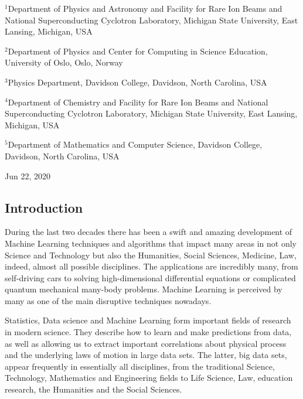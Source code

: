 \documentclass[%
oneside,                 %
final,                   %
10pt]{article}
\begin{document}
\begin{center}
\centerline{{\small ${}^1$Department of Physics and Astronomy and Facility for Rare Ion Beams and National Superconducting Cyclotron Laboratory, Michigan State University, East Lansing, Michigan, USA}}
\centerline{{\small ${}^2$Department of Physics and Center for Computing in Science Education, University of Oslo, Oslo, Norway}}
\centerline{{\small ${}^3$Physics Department, Davidson College, Davidson, North Carolina, USA}}
\centerline{{\small ${}^4$Department of Chemistry and Facility for Rare Ion Beams  and National Superconducting Cyclotron Laboratory, Michigan State University, East Lansing, Michigan, USA}}
\centerline{{\small ${}^5$Department of Mathematics and Computer Science, Davidson College, Davidson, North Carolina, USA}}
\end{center}
    

\begin{center}
Jun 22, 2020
\end{center}

\vspace{1cm}


\subsection{Introduction}

During the last two decades there has been a swift and amazing
development of Machine Learning techniques and algorithms that impact
many areas in not only Science and Technology but also the Humanities,
Social Sciences, Medicine, Law, indeed, almost all possible
disciplines. The applications are incredibly many, from self-driving
cars to solving high-dimensional differential equations or complicated
quantum mechanical many-body problems. Machine Learning is perceived
by many as one of the main disruptive techniques nowadays. 

Statistics, Data science and Machine Learning form important
fields of research in modern science.  They describe how to learn and
make predictions from data, as well as allowing us to extract
important correlations about physical process and the underlying laws
of motion in large data sets. The latter, big data sets, appear
frequently in essentially all disciplines, from the traditional
Science, Technology, Mathematics and Engineering fields to Life
Science, Law, education research, the Humanities and the Social
Sciences.
\end{document}
